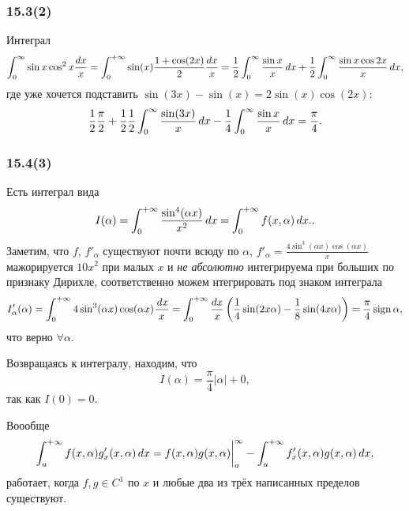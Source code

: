 \subsubsection*{15.3(2)}

Интеграл
\begin{equation*}
    \int_0^\infty \sin x \cos^2 x \frac{dx}{x} = \int_{0}^{+\infty} 
    \sin(x) \frac{1 + \cos (2x)}{2} \frac{dx}{x} = \frac{1}{2} \int_0^\infty \frac{\sin x}{x} \, d x + 
    \frac{1}{2} \int_0^\infty \frac{\sin x \cos 2 x}{x} \, d x,
\end{equation*}
где уже хочется подставить $\sin (3 x) - \sin (x)= 2 \sin(x) \cos(2x)$:
\begin{equation*}
    \frac{1}{2} \frac{\pi}{2} + \frac{1}{2} \frac{1}{2} \int_0^\infty \frac{\sin(3x)}{x} \, d x -
    \frac{1}{4} \int_0^\infty \frac{\sin x}{x} \, d x = \frac{\pi}{4}.
\end{equation*}


\subsubsection*{15.4(3)}

Есть интеграл вида
\begin{equation*}
    I(\alpha) = \int_{0}^{+\infty} \frac{\sin^4 (\alpha x)}{x^2} \, d x = 
    \int_0^{+\infty} f(x, \alpha) \, d x.
    .
\end{equation*}
Заметим, что $f$, $f'_\alpha$  существуют  почти всюду по $\alpha$, $f'_\alpha = \frac{4 \sin ^3(\alpha  x) \cos (\alpha  x)}{x}$ мажорируется $10 x^2$ при  малых $x$ и \textit{не абсолютно} интегрируема при больших по признаку Дирихле, соответственно можем нтегрировать под знаком интеграла
\begin{equation*}
    I'_\alpha (\alpha) = \int_{0}^{+\infty} 4 \sin^3 (\alpha x) \cos(\alpha x) \frac{\, d x}{x}
    =
    \int_{0}^{+\infty} \frac{dx}{x} \left(
        \frac{1}{4} \sin (2 x\alpha) - \frac{1}{8} \sin (4 x \alpha)
    \right) = \frac{\pi}{4} \mathop{\mathrm{sign}}\nolimits \alpha,
\end{equation*}
что верно $\forall \alpha$. 

Возвращаясь к интегралу, находим, что
\begin{equation*}
    I(\alpha) = \frac{\pi}{4} |\alpha| + 0,
\end{equation*}
так как $I(0) = 0$.


\begin{to_thr}
Воообще 
\begin{equation*}
    \int_{a}^{+\infty}  f(x, \alpha) g'_x (x, \alpha) \, d x 
    =
    f(x, \alpha) g(x, \alpha) \bigg|_a^{\infty} - \int_{a}^{+\infty}  f'_x (x, \alpha) g(x, \alpha) \, d x,
\end{equation*}
работает, когда $f, g \in C^1$ по $x$ и любые два из трёх написанных пределов существуют.    
\end{to_thr}




